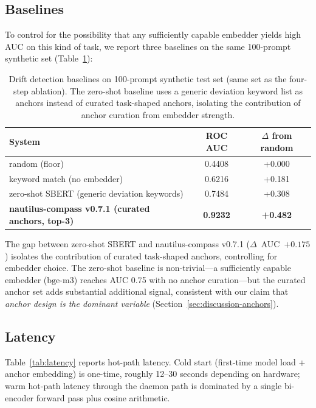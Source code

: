 \subsection{Baselines}
\label{sec:eval-baselines}

To control for the possibility that any sufficiently capable
embedder yields high AUC on this kind of task, we report three
baselines on the same 100-prompt synthetic set
(Table~\ref{tab:baselines}):

\begin{table}[h]
\centering
\caption{Drift detection baselines on 100-prompt synthetic test set
(same set as the four-step ablation). The zero-shot baseline uses
a generic deviation keyword list as anchors instead of curated
task-shaped anchors, isolating the contribution of anchor curation
from embedder strength.}
\label{tab:baselines}
\begin{tabular}{lcc}
\toprule
System & ROC AUC & $\Delta$ from random \\
\midrule
random (floor)                                 & 0.4408 & +0.000 \\
keyword match (no embedder)                    & 0.6216 & +0.181 \\
zero-shot SBERT (generic deviation keywords)   & 0.7484 & +0.308 \\
\textbf{nautilus-compass v0.7.1 (curated anchors, top-3)} & \textbf{0.9232} & \textbf{+0.482} \\
\bottomrule
\end{tabular}
\end{table}

The gap between zero-shot SBERT and nautilus-compass v0.7.1
($\Delta$~AUC~$+0.175$) isolates the contribution of curated
task-shaped anchors, controlling for embedder choice. The
zero-shot baseline is non-trivial---a sufficiently capable
embedder ($\mathrm{bge\text{-}m3}$) reaches AUC 0.75 with no
anchor curation---but the curated anchor set adds substantial
additional signal, consistent with our claim that
\emph{anchor design is the dominant variable}
(Section~\ref{sec:discussion-anchors}).

\subsection{Latency}
\label{sec:eval-latency}

Table~\ref{tab:latency} reports hot-path latency. Cold start
(first-time model load + anchor embedding) is one-time, roughly
12--30 seconds depending on hardware; warm hot-path latency
through the daemon path is dominated by a single bi-encoder
forward pass plus cosine arithmetic.

